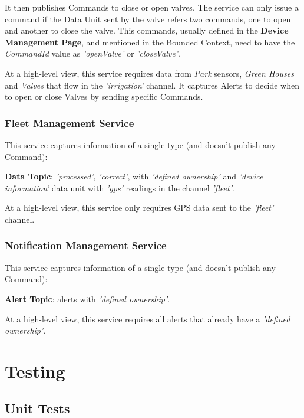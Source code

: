 It then publishes Commands to close or open valves. The service can only issue a command if the Data Unit sent by the valve refers two commands, one to open and another to close the valve. This commands, usually defined in the \textbf{Device Management Page}, and mentioned in the  Bounded Context, need to have the \textit{CommandId} value as \textit{'openValve'} or \textit{'closeValve'}.

At a high-level view, this service requires data from \textit{Park} sensors, \textit{Green Houses} and \textit{Valves} that flow in the \textit{'irrigation'} channel. It captures Alerts to decide when to open or close Valves by sending specific Commands.

\subsubsection*{Fleet Management Service}
\label{subsubsec:implementation:description:services:fleet}

This service captures information of a single type (and doesn't publish any Command):

\textbf{Data Topic}: \textit{'processed'}, \textit{'correct'}, with \textit{'defined ownership'} and \textit{'device information'} data unit with \textit{'gps'} readings in the channel \textit{'fleet'}.

At a high-level view, this service only requires \gls{GPS} data sent to the \textit{'fleet'} channel.

\subsubsection*{Notification Management Service}
\label{subsubsec:implementation:description:services:notification}

This service captures information of a single type (and doesn't publish any Command):

\textbf{Alert Topic}: alerts with \textit{'defined ownership'}.

At a high-level view, this service requires all alerts that already have a \textit{'defined ownership'}.

\section{Testing}
\label{sec:implementation:testing}

\subsection{Unit Tests}
\label{subsec:implementation:tests:unit}

